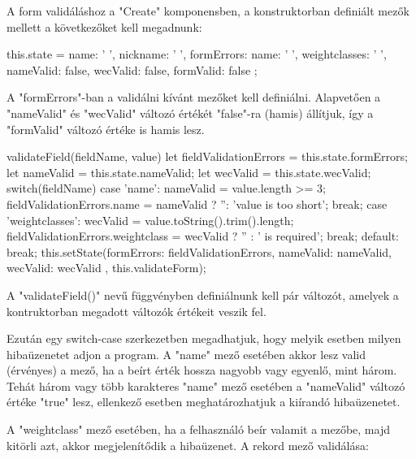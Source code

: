
A form validáláshoz a "Create" komponensben, a konstruktorban definiált mezők mellett a következőket kell megadnunk:

\begin{cpp}
this.state = {
      name: ' ',
      nickname: ' ',
      formErrors: {name: ' ', weightclasses: ' '},
      nameValid: false,
      wecValid: false,
      formValid: false
};
\end{cpp}

A "formErrors"-ban a validálni kívánt mezőket kell definiálni. Alapvetően a "nameValid" és "wecValid" változó értékét "false"-ra (hamis) állítjuk, így a "formValid" változó értéke is hamis lesz.

\begin{cpp}
validateField(fieldName, value) {
	let fieldValidationErrors = this.state.formErrors;
    let nameValid = this.state.nameValid;
    let wecValid = this.state.wecValid;
    switch(fieldName) {
    case 'name':
   	  nameValid = value.length >= 3;
      fieldValidationErrors.name = nameValid ? '': 'value is too short';
      break;
    case 'weightclasses':
      wecValid = value.toString().trim().length;
      fieldValidationErrors.weightclass = wecValid ? '' : ' is required';
      break;
      default:
      break; }
    this.setState({formErrors: fieldValidationErrors,
                    nameValid: nameValid,
                    wecValid: wecValid
                  }, this.validateForm);
}
\end{cpp}

A "validateField()" nevű függvényben definiálnunk kell pár változót, amelyek a kontruktorban megadott változók értékeit veszik fel.

Ezután egy switch-case szerkezetben megadhatjuk, hogy melyik esetben milyen hibaüzenetet adjon a program. 
A "name" mező esetében akkor lesz valid (érvényes) a mező, ha a beírt érték hossza nagyobb vagy egyenlő, mint három. Tehát három vagy több karakteres "name" mező esetében a "nameValid" változó értéke "true" lesz, ellenkező esetben meghatározhatjuk a kiírandó hibaüzenetet.

A "weightclass" mező esetében, ha a felhasználó beír valamit a mezőbe, majd kitörli azt, akkor megjelenítődik a hibaüzenet.
A rekord mező validálása:


